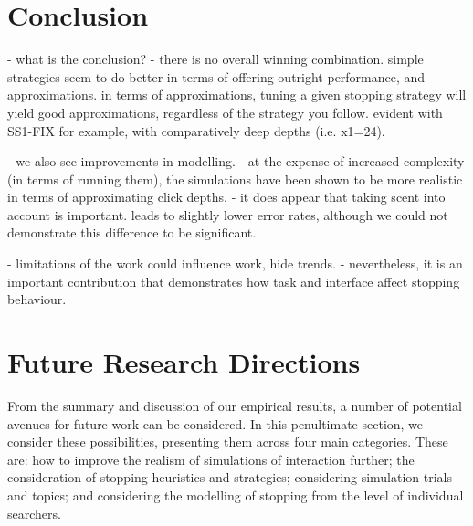 %
%


\section{Conclusion}\label{sec:conclusions:conclusion}










- what is the conclusion?
    - there is no overall winning combination. simple strategies seem to do better in terms of offering outright performance, and approximations. in terms of approximations, tuning a given stopping strategy will yield good approximations, regardless of the strategy you follow. evident with SS1-FIX for example, with comparatively deep depths (i.e. x1=24).

- we also see improvements in modelling.
- at the expense of increased complexity (in terms of running them), the simulations have been shown to be more realistic in terms of approximating click depths.
    - it does appear that taking scent into account is important. leads to slightly lower error rates, although we could not demonstrate this difference to be significant.

- limitations of the work could influence work, hide trends.
- nevertheless, it is an important contribution that demonstrates how task and interface affect stopping behaviour.

\section{Future Research Directions}\label{sec:conclusions:future}
From the summary and discussion of our empirical results, a number of potential avenues for future work can be considered. In this penultimate section, we consider these possibilities, presenting them across four main categories. These are: how to improve the realism of simulations of interaction further; the consideration of stopping heuristics and strategies; considering simulation trials and topics; and considering the modelling of stopping from the level of individual searchers.

